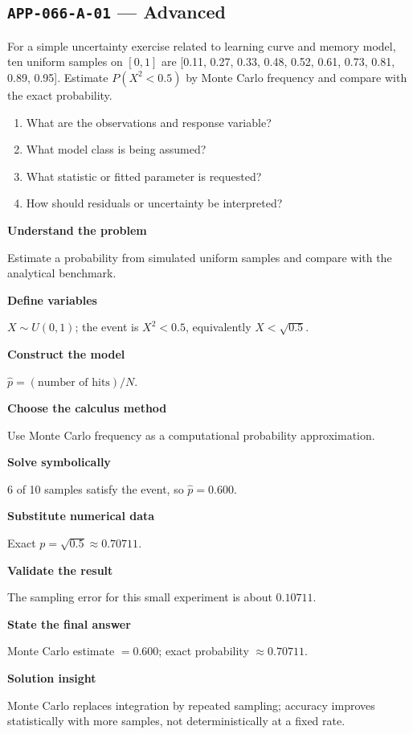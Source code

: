 \documentclass[11pt]{book}
\newcommand{\pid}[1]{\texttt{#1}}
\begin{document}
\subsection*{\pid{APP-066-A-01} — Advanced}
\begin{problembox}
For a simple uncertainty exercise related to learning curve and memory model, ten uniform samples on $[0,1]$ are [0.11, 0.27, 0.33, 0.48, 0.52, 0.61, 0.73, 0.81, 0.89, 0.95]. Estimate $P(X^2<0.5)$ by Monte Carlo frequency and compare with the exact probability.
\end{problembox}
\begin{promptbox}\begin{enumerate}
\item What are the observations and response variable?
\item What model class is being assumed?
\item What statistic or fitted parameter is requested?
\item How should residuals or uncertainty be interpreted?
\end{enumerate}\end{promptbox}
\begin{solutionbox}
\textbf{Understand the problem}\par Estimate a probability from simulated uniform samples and compare with the analytical benchmark.\par\medskip
\textbf{Define variables}\par $X\sim U(0,1)$; the event is $X^2<0.5$, equivalently $X<\sqrt{0.5}$.\par\medskip
\textbf{Construct the model}\par $\widehat p=(\text{number of hits})/N$.\par\medskip
\textbf{Choose the calculus method}\par Use Monte Carlo frequency as a computational probability approximation.\par\medskip
\textbf{Solve symbolically}\par 6 of 10 samples satisfy the event, so $\widehat p=0.600$.\par\medskip
\textbf{Substitute numerical data}\par Exact $p=\sqrt{0.5}\approx 0.70711$.\par\medskip
\textbf{Validate the result}\par The sampling error for this small experiment is about $0.10711$.\par\medskip
\textbf{State the final answer}\par Monte Carlo estimate $=0.600$; exact probability $\approx 0.70711$.\par\medskip
\textbf{Solution insight}\par Monte Carlo replaces integration by repeated sampling; accuracy improves statistically with more samples, not deterministically at a fixed rate.\par\medskip
\end{solutionbox}
\end{document}
